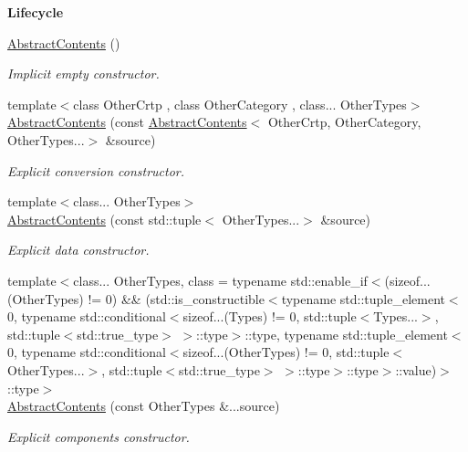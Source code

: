 \begin{Indent}{\bf Lifecycle}\par
\begin{DoxyCompactItemize}
\item 
\hyperlink{classmagrathea_1_1AbstractContents_a061c19c81bf7973030302522512ebc59}{Abstract\-Contents} ()
\begin{DoxyCompactList}\small\item\em Implicit empty constructor. \end{DoxyCompactList}\item 
{\footnotesize template$<$class Other\-Crtp , class Other\-Category , class... Other\-Types$>$ }\\\hyperlink{classmagrathea_1_1AbstractContents_a3bdd32188dac529ee74d09e16cdc438a}{Abstract\-Contents} (const \hyperlink{classmagrathea_1_1AbstractContents}{Abstract\-Contents}$<$ Other\-Crtp, Other\-Category, Other\-Types...$>$ \&source)
\begin{DoxyCompactList}\small\item\em Explicit conversion constructor. \end{DoxyCompactList}\item 
{\footnotesize template$<$class... Other\-Types$>$ }\\\hyperlink{classmagrathea_1_1AbstractContents_a8bdb7fc84d27f947a63209fdbde2ccdd}{Abstract\-Contents} (const std\-::tuple$<$ Other\-Types...$>$ \&source)
\begin{DoxyCompactList}\small\item\em Explicit data constructor. \end{DoxyCompactList}\item 
{\footnotesize template$<$class... Other\-Types, class  = typename std\-::enable\-\_\-if$<$(sizeof...(\-Other\-Types) != 0) \&\& (std\-::is\-\_\-constructible$<$typename std\-::tuple\-\_\-element$<$0, typename std\-::conditional$<$sizeof...(\-Types) != 0, std\-::tuple$<$\-Types...$>$, std\-::tuple$<$std\-::true\-\_\-type$>$ $>$\-::type$>$\-::type, typename std\-::tuple\-\_\-element$<$0, typename std\-::conditional$<$sizeof...(\-Other\-Types) != 0, std\-::tuple$<$\-Other\-Types...$>$, std\-::tuple$<$std\-::true\-\_\-type$>$ $>$\-::type$>$\-::type$>$\-::value)$>$\-::type$>$ }\\\hyperlink{classmagrathea_1_1AbstractContents_a9e67fc30b3e9fec4d15978dde4f4a1b4}{Abstract\-Contents} (const Other\-Types \&...source)
\begin{DoxyCompactList}\small\item\em Explicit components constructor. \end{DoxyCompactList}\end{DoxyCompactItemize}
\end{Indent}
